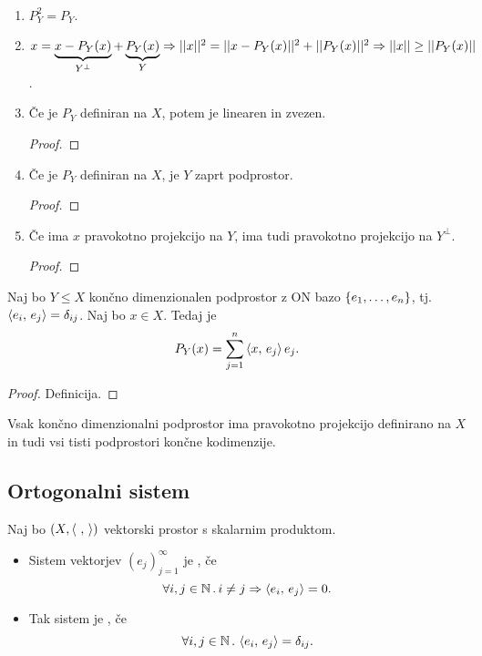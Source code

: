 \begin{opomba}
    \ 
    \begin{enumerate}
        \item \(P_Y^2 = P_Y\).
        \item \(x = \underbrace{x - P_Y(x)}_{Y^\perp} + \underbrace{P_Y(x)}_Y \Rightarrow ||x||^2 = ||x - P_Y(x)||^2 + ||P_Y(x)||^2 \Rightarrow ||x|| \geq ||P_Y(x)||\).
        \item Če je \(P_Y\) definiran na \(X\), potem je linearen in zvezen.
        \begin{proof}
            \todo
        \end{proof}
        \item Če je \(P_Y\) definiran na \(X\), je \(Y\) zaprt podprostor.
        \begin{proof}
            \todo
        \end{proof}
        \item Če ima \(x\) pravokotno projekcijo na \(Y\), ima tudi pravokotno projekcijo na \(Y^\perp\).
        \begin{proof}
            \todo
        \end{proof}
    \end{enumerate}
\end{opomba}

\begin{trditev}
    Naj bo \(Y \leq X\) končno dimenzionalen podprostor z ON bazo \(\left\{e_1, \ldots, e_n\right\}\), tj. \(\left\langle e_i, \, e_j \right\rangle = \delta_{ij}\). Naj bo \(x \in X\). Tedaj je \[P_Y(x) = \sum_{j=1}^{n} \left\langle x, \, e_j \right\rangle e_j.\]
\end{trditev}

\begin{proof}
    Definicija.
\end{proof}

\begin{opomba}
    Vsak končno dimenzionalni podprostor ima pravokotno projekcijo definirano na \(X\) in tudi vsi tisti podprostori končne kodimenzije.
\end{opomba}

\subsection{Ortogonalni sistem}
\begin{definicija}
    Naj bo \((X, \left\langle \ , \,  \right\rangle)\) vektorski prostor s skalarnim produktom. 
    \begin{itemize}
        \item Sistem vektorjev \((e_j)_{j=1}^\infty\) je , če \[\forall i,j \in \mathbb{N} \,.\, i \neq j \Rightarrow \left\langle e_i, \, e_j \right\rangle = 0.\]
        \item Tak sistem je \df{ortonormiran (ONS)}, če \[\forall i,j \in \mathbb{N} \,.\, \left\langle e_i, \, e_j \right\rangle = \delta_{ij}.\]
    \end{itemize}   
\end{definicija}

